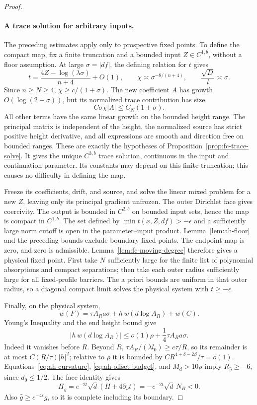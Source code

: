 \begin{proof}
\paragraph{A trace solution for arbitrary inputs.}
The preceding estimates apply only to prospective fixed points.
To define the compact map, fix a finite truncation and a bounded
input \(Z\in C^{1,b}\), without a floor assumption.
At large \(\sigma=|df|\), the defining relation for \(t\) gives
\[
 t=\frac{4Z-\log(\lambda\sigma)}{n+4}+O(1),\qquad
 \chi\asymp\sigma^{-8/(n+4)},\qquad
 \frac{\sqrt D}{l}\asymp\sigma .
\]
Since \(n\ge N\ge4\), \(\chi\ge c/(1+\sigma)\).
The new coefficient \(A\) has growth \(O(\log(2+\sigma))\), but its
normalized trace contribution has size
\[
 C\sigma\chi|A|\le C_N(1+\sigma).
\]
All other terms have the same linear growth on the bounded height
range. The principal matrix is independent of the height, the
normalized source has strict positive height derivative, and all
expressions are smooth and direction free on bounded ranges.
These are exactly the hypotheses of
Proposition~\ref{prop:fc-trace-solve}. It gives the unique
\(C^{3,b}\) trace solution, continuous in the input and continuation
parameter. Its constants may depend on this finite truncation;
this causes no difficulty in defining the map.

Freeze its coefficients, drift, and source, and solve the linear
mixed problem for a new \(Z\), leaving only its principal gradient
unfrozen. The outer Dirichlet face gives coercivity. The output
is bounded in \(C^{2,b}\) on bounded input sets, hence the map is
compact in \(C^{1,b}\). The set defined by
\(\min t(x,Z,df)>-\epsilon\) and a sufficiently large norm cutoff
is open in the parameter--input product.
Lemma~\ref{lem:ah-floor} and the preceding bounds exclude boundary
fixed points. The endpoint map is zero, and zero is admissible.
Lemma~\ref{lem:fc-moving-degree} therefore gives a physical
fixed point. First take \(N\) sufficiently large for the finite
list of polynomial absorptions and compact separations; then take
each outer radius sufficiently large for all fixed-profile barriers.
The a priori bounds are uniform in that outer radius, so a diagonal
compact limit solves the physical system with \(t\ge-\epsilon\).

Finally, on the physical system,
\[
 w(F)=\tau A_Ra\sigma+h\,w(d\log A_R)+w(C).
\]
Young's Inequality and the end height bound give
\begin{equation}\label{eq:ah-capillary-error}
 |h\,w(d\log A_R)|
 \le o(1)\rho+\frac14\tau A_Ra\sigma .
\end{equation}
Indeed it vanishes before \(R\). Beyond \(R\),
\(\tau A_R/(\lambda l_0)\ge c\tau/R\), so its remainder is at
most \(C(R/\tau)|h|^2\); relative to \(\rho\) it is bounded by
\(CR^{4+\delta-2\beta}/\tau=o(1)\).
Equations~\eqref{eq:ah-curvature}, \eqref{eq:ah-offset-budget},
and \(M_d>10\rho\) imply \(R_{\widehat g}\ge-6\), since
\(d_0\le1/2\). The face identity gives
\[
 H_{\widehat g}=e^{-2t}\sqrt d(H+4\partial_\nu t)
             =-e^{-2t}\sqrt d\,N_B<0.
\]
Also \(\widehat g\ge e^{-4\epsilon}g\), so it is complete including
its boundary.
\end{proof}

